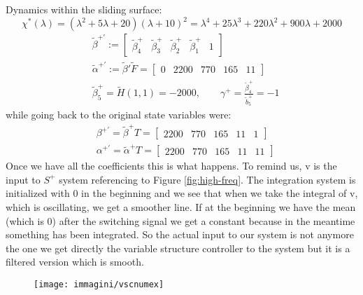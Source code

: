 Dynamics within the sliding surface:
\[\chi^*(\lambda)=(\lambda^2+5\lambda+20)(\lambda+10)^2=\lambda^4+25\lambda^3+220\lambda^2+900\lambda+2000\]
\[
\begin{aligned}
		&\tilde{\beta}^{+'}:=\begin{bmatrix}
			\tilde{\beta}^+_4 & \tilde{\beta}^+_3 & \tilde{\beta}^+_2 & \tilde{\beta}^+_1 & 1
		\end{bmatrix}\\
	&\tilde{\alpha}^{+'}:=\tilde{\beta}'\tilde{F}=\begin{bmatrix}
		0 & 2200  &770 & 165 & 11
	\end{bmatrix}\\
	&\tilde{\beta}^+_5=\tilde{H}(1,1)=-2000,\qquad \gamma^+=\frac{\tilde{\beta}^+_4}{\tilde{b}^+_5}=-1
\end{aligned}
\]while going back to the original state variables were:
\[
\begin{aligned}
	&\beta^{+'}=\tilde{\beta}^+T=\begin{bmatrix}
		2200 & 770 & 165 & 11 & 1
	\end{bmatrix}\\
&\alpha^{+'}=\tilde{\alpha}^+T=\begin{bmatrix}
	2200 & 770 & 165 & 11 & 11
\end{bmatrix}
\end{aligned}
\]Once we have all the coefficients this is what happens. To remind us, v is the input to $S^+$ system referencing to Figure \ref{fig:high-freq}. The integration system is initialized with 0 in the beginning and we see that when we take the integral of v, which is oscillating, we get a smoother line. If at the beginning we have the mean (which is 0) after the switching signal we get a constant because in the meantime something has been integrated. So the actual input to our system is not anymore the one we get directly the variable structure controller  to the system but it is a filtered version which is smooth.
\begin{figure}[H]
	\centering
	\texttt{[image: immagini/vscnumex]}
	\caption{}
	\label{fig:vscnumex}
\end{figure}

